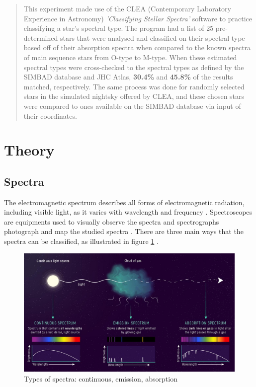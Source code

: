 \documentclass[12pt]{article}
\begin{document}
\begin{abstract}

This experiment made use of the CLEA (Contemporary Laboratory Experience in Astronomy) \textit{'Classifying Stellar Spectra'} software to practice classifying a star's spectral type.
The program had a list of 25 pre-determined stars that were analysed and classified on their spectral type based off of their absorption spectra when compared to the known
spectra of main sequence stars from O-type to M-type. When these estimated spectral types were cross-checked to the spectral types as defined by the SIMBAD database and JHC Atlas,
\textbf{30.4\%} and \textbf{45.8\%} of the results matched, respectively. The same process was done for randomly selected stars in the simulated nightsky offered by CLEA, and these chosen
stars were compared to ones available on the SIMBAD database via input of their coordinates. 

\end{abstract}


\vspace{2.5cm}

\section{Theory} \label{sec:1}

\subsection{Spectra}

The electromagnetic spectrum describes all forms of electromagnetic radiation, including visible light, as it varies with wavelength
and frequency  
\cite{britspectra,hubblespectra}.
Spectroscopes are equipments used to visually observe the spectra and spectrographs photograph and map the studied spectra
\cite{britspectra}.
There are three main ways that the spectra can be classified, as illustrated in figure \ref{fig:spectra} \cite{spectrapic}.

\begin{figure}[H]
    \centering
    \includegraphics[width=15cm]{spectra.jpg}
    \caption{\centering \footnotesize{Types of spectra: continuous, emission, absorption \protect\cite{spectrapic}}}
    \label{fig:spectra}
\end{figure}
\end{document}
